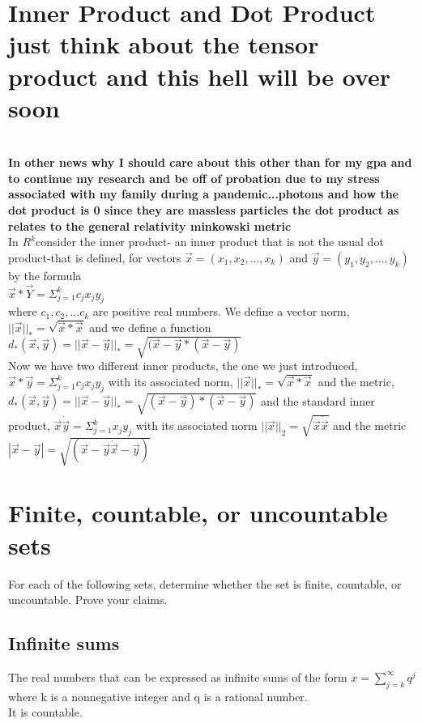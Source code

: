 \section*{Inner Product and Dot Product just think about the tensor product and this hell will be over soon}\\ 
\textbf{In other news why I should care about this other than for my gpa and to continue my research and be off of probation due to my stress associated with my family during a pandemic...photons and how the dot product is 0 since they are massless particles the dot product as relates to the general relativity minkowski metric }\\
In $R^k$consider the inner product- an inner product that is not the usual dot product-that is defined, for vectors $\Vec{x}=(x_1,x_2,...,x_k)$ and $\Vec{y}=(y_1,y_2, ..., y_k)$ by the formula \\ 
$\Vec{x} * \Vec{Y}= \Sigma_{j=1}^{k}c_j x_j y_j$ \\ 
where $c_1, c_2, ... c_k$ are positive real numbers. We define a vector norm, $||\Vec{x}||_{*}=\sqrt{\Vec{x}*\Vec{x}}$ and we define a function $d_*(\Vec{x}, \Vec{y})=||\Vec{x}-\Vec{y}||_*=\sqrt{(\Vec{x}-\Vec{y}*(\Vec{x}-\Vec{y})}$ \\ 
Now we have two different inner products, the one we just introduced, $\Vec{x}*\Vec{y}=\Sigma_{j=1}^k c_{j}x_{j}y_{j}$ with its associated norm, $||\Vec{x}||_*=\sqrt{\Vec{x}*\Vec{x}}$ and the metric, $d_{*}(\Vec{x},\Vec{y})=||\Vec{x}-\Vec{y}||_{*}=\sqrt{(\Vec{x}-\Vec{y})*(\Vec{x}-\Vec{y})}$ and the standard inner product, $\Vec{x}\dot\Vec{y}=\Sigma_{j=1}^{k}x_jy_j$ with its associated norm $||\Vec{x}||_2 = \sqrt{\Vec{x}\dot \Vec{x}}$ and the metric $|\Vec{x}-\Vec{y}|=\sqrt{(\Vec{x}-\Vec{y}\dot \Vec{x}-\Vec{y})}$ \\ 



\section{Finite, countable, or uncountable sets}
For each of the following sets, determine whether the set is finite, countable, or uncountable. Prove your claims. \\ 
\subsection{Infinite sums}
The real numbers that can be expressed as infinite sums of the form $x= \sum_{j=k}^\infty q^{j}$ where k is a nonnegative integer and q is a rational number. 
\\ 
It is countable.
